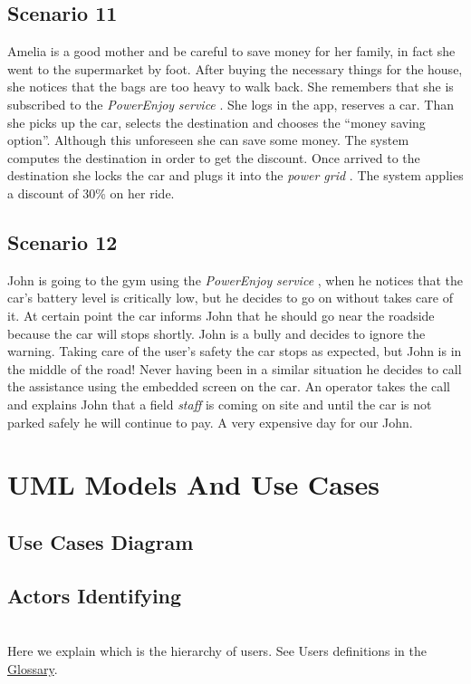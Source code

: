 \documentclass[english]{article}
\newcommand{\powerenjoy}{\textit{PowerEnjoy }}
\newcommand{\staff}{\textit{staff }}
\newcommand{\service}{\textit{service }}
\newcommand{\powergrid}{\textit{power grid }}
\begin{document}
	\subsection{Scenario 11}
		Amelia is a good mother and be careful to save money for her family, in fact she went to the supermarket by foot. After buying the necessary things for the house, she notices that the bags are too heavy to walk back. She remembers that she is subscribed to the \powerenjoy \service. She logs in the app, reserves a car. Than she picks up the car, selects the destination and chooses the ``money saving option''. Although this unforeseen she can save some money. The system computes the destination in order to get the discount. Once arrived to the destination she locks the car and plugs it into the \powergrid. The system applies a discount of 30\% on her ride.
	\subsection{Scenario 12}
		John is going to the gym using the \powerenjoy \service, when he notices that the car's battery level is critically low, but he decides to go on without takes care of it. At certain point the car informs John that he should go near the roadside because the car will stops shortly. John is a bully and decides to ignore the warning. Taking care of the user's safety the car stops as expected, but John is in the middle of the road! Never having been in a similar situation he decides to call the assistance using the embedded screen on the car. An operator takes the call and explains John that a field \staff is coming on site and until the car is not parked safely he will continue to pay. A very expensive day for our John.		
	
\section{UML Models And Use Cases}
	\subsection{Use Cases Diagram}
	\noindent



	\subsection{Actors Identifying}
		\noindent
		\\
	Here we explain which is the hierarchy of users. See Users definitions in the \hyperref[sec:Glossary]{Glossary}.  
\end{document}
